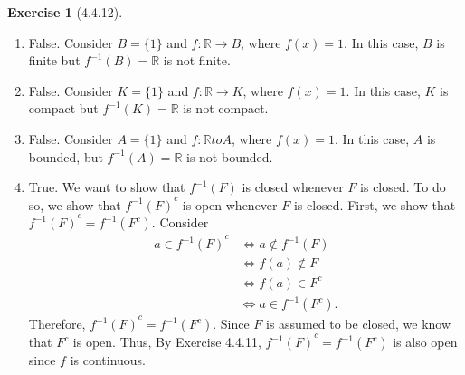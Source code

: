 \documentclass{amsart}
\theoremstyle{definition}
\newtheorem{exercise}{Exercise}
\newcommand{\R}{\mathbb{R}}
\begin{document}
\begin{exercise}[4.4.12]
  \begin{enumerate}[label={(\alph*)}]
    \item False. Consider $B = \{1\}$ and $f : \R \to B$, where $f(x) = 1$. In
      this case, $B$ is finite but $f^{-1}(B) = \R$ is not finite.
    \item False. Consider $K = \{1\}$ and $f : \R \to K$, where $f(x) = 1$. In
      this case, $K$ is compact but $f^{-1}(K) = \R$ is not compact.
    \item False. Consider $A = \{1\}$ and $f : \R to A$, where $f(x) = 1$. In
      this case, $A$ is bounded, but $f^{-1}(A) = \R$ is not bounded.
    \item True. We want to show that $f^{-1}(F)$ is closed whenever $F$ is
      closed. To do so, we show that ${f^{-1}(F)}^c$ is open whenever $F$ is
      closed. First, we show that ${f^{-1}(F)}^c = f^{-1}(F^c)$. Consider
      \begin{align*}
        a \in {f^{-1}(F)}^c &\iff a \notin f^{-1}(F) \\
        &\iff f(a) \notin F \\
        &\iff f(a) \in F^c \\
        &\iff a \in f^{-1}(F^c).
      \end{align*}
      Therefore, ${f^{-1}(F)}^c = f^{-1}(F^c)$. Since $F$ is assumed to be
      closed, we know that $F^c$ is open. Thus, By Exercise 4.4.11,
      ${f^{-1}(F)}^c = f^{-1}(F^c)$ is also open since $f$ is continuous.
  \end{enumerate}
\end{exercise}
\end{document}
